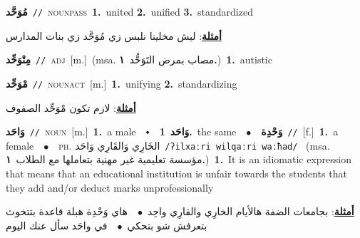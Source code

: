 \documentclass[10pt,a4paper,twoside]{article} %
\begin{document}
\begin{multicols}{2}
{\setlength\topsep{0pt}\textbf{\foreignlanguage{arabic}{مُوَحَّد}}\ {\color{gray}\texttt{//}\color{black}}\ \textsc{noun\textunderscore pass}\ \textbf{1.}~united  \textbf{2.}~unified  \textbf{3.}~standardized\  \begin{flushright}\color{gray}\foreignlanguage{arabic}{\textbf{\underline{\foreignlanguage{arabic}{أمثلة}}}: ليش مخلينا نلبس زي مُوَحَّد زي بنات المدارس}\end{flushright}\color{black}} \vspace{2mm}

{\setlength\topsep{0pt}\textbf{\foreignlanguage{arabic}{مِتْوَحِّد}}\ {\color{gray}\texttt{//}\color{black}}\ \textsc{adj}\ [m.]\ \color{gray}(msa. \foreignlanguage{arabic}{مصاب بمرض التَوَحُّد}~\foreignlanguage{arabic}{\textbf{١.}})\color{black}\ \textbf{1.}~autistic\ } \vspace{2mm}

{\setlength\topsep{0pt}\textbf{\foreignlanguage{arabic}{مْوَحِّد}}\ {\color{gray}\texttt{//}\color{black}}\ \textsc{noun\textunderscore act}\ [m.]\ \textbf{1.}~unifying  \textbf{2.}~standardizing\  \begin{flushright}\color{gray}\foreignlanguage{arabic}{\textbf{\underline{\foreignlanguage{arabic}{أمثلة}}}: لازم تكون مْوَحِّد الصفوف}\end{flushright}\color{black}} \vspace{2mm}

{\setlength\topsep{0pt}\textbf{\foreignlanguage{arabic}{وَاحَد}}\ {\color{gray}\texttt{//}\color{black}}\ \textsc{noun}\ [m.]\ \textbf{1.}~a male\ \ $\smblkdiamond$\ \ \setlength\topsep{0pt}\textbf{\foreignlanguage{arabic}{وَاحَد}}\ \textbf{1.}~the same\ \ $\bullet$\ \ \setlength\topsep{0pt}\textbf{\foreignlanguage{arabic}{وَحْدِة}}\ {\color{gray}\texttt{//}\color{black}}\ [f.]\ \textbf{1.}~a female\ \ $\bullet$\ \ \textsc{ph.} \color{gray} \foreignlanguage{arabic}{الخَارِي وَالقَارِي وَاحَد}\color{black}\ {\color{gray}\texttt{/{\sffamily ʔilxaːri wilqaːri waːħad}/}\color{black}}\ \color{gray} (msa. \foreignlanguage{arabic}{مؤسسة تعليمية غير مهنية بتعاملها مع الطلاب}~\foreignlanguage{arabic}{\textbf{١.}})\color{black}\ \textbf{1.}~It is an idiomatic expression that means that an educational institution is unfair towards the students that they add and/or deduct marks unprofessionally\  \begin{flushright}\color{gray}\foreignlanguage{arabic}{\textbf{\underline{\foreignlanguage{arabic}{أمثلة}}}: بجامعات الضفة هالأيام الخارِي والقارِي واحِد\ $\bullet$\ \  هاي وَحْدِة هبلة قاعدة بتتخوث بتعرفش شو بتحكي\ $\bullet$\ \  في واحَد سأل عنك اليوم}\end{flushright}\color{black}} \vspace{2mm}


\end{multicols}
\end{document}
